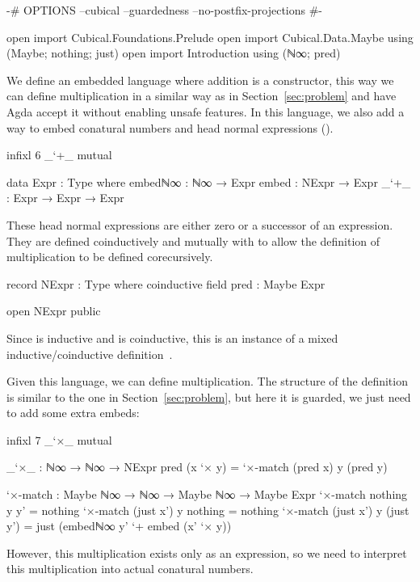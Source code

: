 \begin{code}[hide]
{-# OPTIONS --cubical --guardedness --no-postfix-projections #-}

open import Cubical.Foundations.Prelude
open import Cubical.Data.Maybe using (Maybe; nothing; just)
open import Introduction using (ℕ∞; pred)
\end{code}
We define an embedded language where addition is a constructor, this way we can
define multiplication in a similar way as in Section~\ref{sec:problem} and have
Agda accept it without enabling unsafe features. In this language, we also add a
way to embed conatural numbers and head normal expressions ().
\begin{code}[hide]
infixl 6 _`+_
mutual
\end{code}
\begin{code}
  data Expr : Type where
    embedℕ∞  : ℕ∞ → Expr
    embed    : NExpr → Expr
    _`+_     : Expr → Expr → Expr
\end{code}
These head normal expressions are either zero or a successor of an expression.
They are defined coinductively and mutually with  to allow
the definition of multiplication to be defined corecursively.
\begin{code}
  record NExpr : Type where
    coinductive
    field
      pred : Maybe Expr
\end{code}
\begin{code}[hide]
open NExpr public
\end{code}
Since  is inductive and  is coinductive,
this is an instance of a mixed inductive/coinductive
definition~\cite{hancock-stream}.

Given this language, we can define multiplication. The structure of
the definition is similar to the one in Section~\ref{sec:problem}, but here it
is guarded, we just need to add some extra embeds:
\begin{code}[hide]
infixl 7 _`×_
mutual
\end{code}
\begin{code}
  _`×_ : ℕ∞ → ℕ∞ → NExpr
  pred (x `× y) = `×-match (pred x) y (pred y)

  `×-match :
    Maybe ℕ∞ → ℕ∞ → Maybe ℕ∞ → Maybe Expr
  `×-match nothing    y y'         = nothing
  `×-match (just x')  y nothing    = nothing
  `×-match (just x')  y (just y')  =
    just (embedℕ∞ y' `+ embed (x' `× y))
\end{code}
However, this multiplication exists only as an expression, so we need to
interpret this multiplication into actual conatural numbers.

